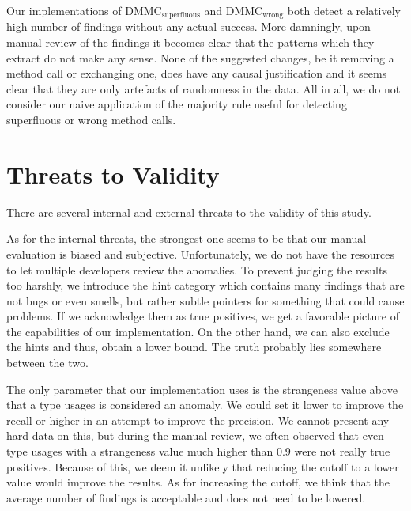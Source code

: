 Our implementations of $\text{DMMC}_\text{superfluous}$ and $\text{DMMC}_\text{wrong}$ both detect a relatively high number of findings without any actual success.
More damningly, upon manual review of the findings it becomes clear that the patterns which they extract do not make any sense.
None of the suggested changes, be it removing a method call or exchanging one, does have any causal justification and it seems clear that they are only artefacts of randomness in the data.
All in all, we do not consider our naive application of the majority rule useful for detecting superfluous or wrong method calls.

\section{Threats to Validity}

There are several internal and external threats to the validity of this study.

As for the internal threats, the strongest one seems to be that our manual evaluation is biased and subjective.
Unfortunately, we do not have the resources to let multiple developers review the anomalies.
To prevent judging the results too harshly, we introduce the hint category which contains many findings that are not bugs or even smells, but rather subtle pointers for something that could cause problems.
If we acknowledge them as true positives, we get a favorable picture of the capabilities of our implementation.
On the other hand, we can also exclude the hints and thus, obtain a lower bound.
The truth probably lies somewhere between the two.

The only parameter that our implementation uses is the strangeness value above that a type usages is considered an anomaly.
We could set it lower to improve the recall or higher in an attempt to improve the precision.
We cannot present any hard data on this, but during the manual review, we often observed that even type usages with a strangeness value much higher than $0.9$ were not really true positives.
Because of this, we deem it unlikely that reducing the cutoff to a lower value would improve the results.
As for increasing the cutoff, we think that the average number of findings is acceptable and does not need to be lowered.

